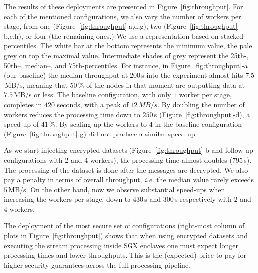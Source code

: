 The results of these deployments are presented in Figure~\ref{fig:throughput}.
For each of the mentioned configurations, we also vary the number of workers per stage, from one (Figure~\ref{fig:throughput}-a,d,g), two (Figure~\ref{fig:throughput}-b,e,h), or four (the remaining ones.)
We use a representation based on stacked percentiles.
The white bar at the bottom represents the minimum value, the pale grey on top the maximal value.
Intermediate shades of grey represent the 25th-, 50th–, median–, and 75th-percentiles.
For instance, in Figure~\ref{fig:throughput}-a (our baseline) the median throughput at $200$\,s into the experiment almost hits $7.5$\,MB/s, meaning that $50$\,\% of the nodes in that moment are outputting data at $7.5$\,MB/s or less.
The baseline configuration, with only $1$ worker per stage, completes in $420$ seconds, with a peak of $12\,MB/s$.
By doubling the number of workers reduces the processing time down to $250$\,s (Figure~\ref{fig:throughput}-d), a speed-up of $41$\,\%.
By scaling up the workers to 4 in the baseline configuration (Figure~\ref{fig:throughput}-g) did not produce a similar speed-up.

As we start injecting encrypted datasets (Figure~\ref{fig:throughput}-b and follow-up configurations with 2 and 4 workers), the processing time almost doubles ($795$\,s).
The processing of the dataset is done after the messages are decrypted.
We also pay a penalty in terms of overall throughput, \emph{i.e.} the median value rarely exceeds $5$\,MB/s.
On the other hand, now we observe substantial speed-ups when increasing the workers per stage, down to $430$\,s and $300$\,s respectively with $2$ and $4$ workers.

The deployment of the most secure set of configurations (right-most column of plots in Figure~\ref{fig:throughput}) shows that when using encrypted datasets and executing the stream processing inside SGX enclaves one must expect longer processing times and lower throughputs.
This is the (expected) price to pay for higher-security guarantees across the full processing pipeline.

